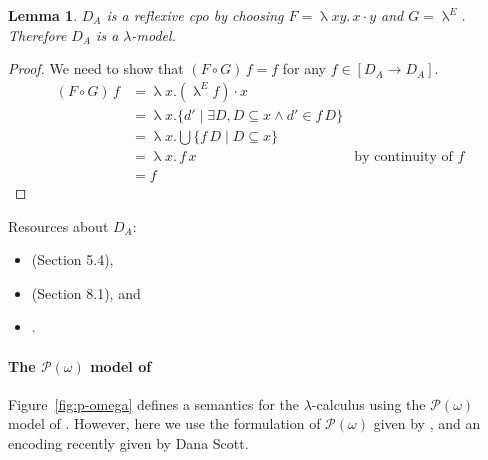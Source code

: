 \documentclass{tufte-handout}
\newtheorem{lemma}[theorem]{Lemma}
\begin{document}
\begin{lemma}
  $D_A$ is a reflexive cpo by choosing $F = \uplambda x y.\, x \cdot
  y$ and $G= \uplambda^E$. Therefore $D_A$ is a
  $\lambda$-model.
\end{lemma}
\begin{proof}
  We need to show that $(F \circ G)\,f = f$
  for any $f \in [D_A \to D_A]$.
  \begin{align*}
    (F \circ G)\,f &= \uplambda x. (\uplambda^E f) \cdot x\\
    &= \uplambda x. \{ d' \mid \exists D, D \subseteq x \land d' \in f\,D \}\\
    &= \uplambda x. \bigcup \{ f\,D \mid D \subseteq x \} \\
    &= \uplambda x.\, f\, x  & \text{by continuity of } f \\
    &= f
  \end{align*}
\end{proof}


\noindent Resources about $D_A$:
\begin{itemize}
\item \citet{barendregt84:_lambda_calculus} (Section 5.4),
\item \citet{Gunter:1992aa} (Section 8.1), and
\item \citet{Engeler:1981aa}.
\end{itemize}


\paragraph{The $\mathcal{P}(\omega)$ model of \citet{Scott:1976lq}}
\label{sec:p-omega}



Figure~\ref{fig:p-omega} defines a semantics for the
$\lambda$-calculus using the $\mathcal{P}(\omega)$ model of
\citet{Scott:1976lq}.  However, here we use the formulation of
$\mathcal{P}(\omega)$ given by \citet{barendregt84:_lambda_calculus},
and an encoding recently given by Dana Scott.

\newcommand{\EPo}[0]{E_S}
\newcommand{\POSEM}[1]{\EPo{}\,#1\,}
\end{document}
